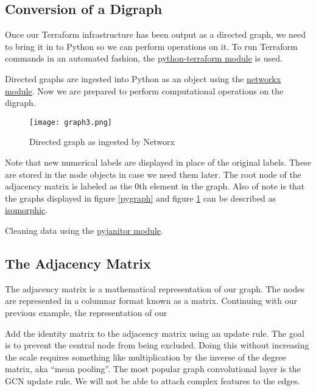 \subsection{\label{sec:conversion}Conversion of a Digraph}

\justifying
Once our Terraform infrastructure has been output as a directed graph, we need to bring it in to Python so we can
perform operations on it. To run Terraform commands in an automated fashion,
the \href{https://pypi.org/project/python-terraform/}{python-terraform module} is used.
\vspace{2mm}

\justifying
Directed graphs are ingested into Python as an object using the \href{https://pypi.org/project/networkx/}{networkx module}. Now we are prepared
to perform computational operations on the digraph.
\vspace{2mm}

\justifying
\begin{figure}[H]
    \texttt{[image: graph3.png]}
    \caption{Directed graph as ingested by Networx}
    \label{digraph}
\end{figure}

\justifying
Note that new numerical labels are displayed in place of the original labels. These are
stored in the node objects in case we need them later. The root node of the adjacency matrix is labeled
as the 0th element in the graph. Also of note is that the graphs displayed in figure \ref{pygraph} and figure \ref{digraph} can be described as \href{https://en.wikipedia.org/wiki/Graph\_isomorphism}{isomorphic}.
\vspace{2mm}

\justifying
Cleaning data using the \href{}{pyjanitor module}.
\vspace{2mm}

\subsection{\label{sec:adjacency}The Adjacency Matrix}

\justifying
The adjacency matrix is a mathematical representation of our graph. The nodes are represented in a
columnar format known as a matrix. Continuing with our previous example, the representation of our

Add the identity matrix to the adjacency matrix using an update rule.
The goal is to prevent the central node from being excluded. Doing this without increasing the scale requires something like multiplication by the inverse of the degree matrix, aka ``mean pooling''. The
most popular graph convolutional layer is the GCN update rule. We will not be able to attach complex features to the edges.

